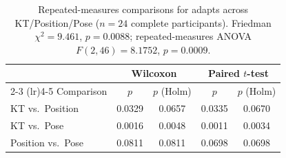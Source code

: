 \begin{table}[htbp]
\centering
\caption{Repeated-measures comparisons for adapts across KT/Position/Pose ($n = 24$ complete participants). Friedman $\chi^2 = 9.461$, $p = 0.0088$; repeated-measures ANOVA $F(2,46) = 8.1752$, $p = 0.0009$.}
\label{tab:comparisons-adapts}
\begin{tabular}{lcccc}
\toprule
& \multicolumn{2}{c}{Wilcoxon} & \multicolumn{2}{c}{Paired $t$-test} \\
\cmidrule(lr){2-3} \cmidrule(lr){4-5}
Comparison & $p$ & $p$ (Holm) & $p$ & $p$ (Holm) \\
\midrule
KT vs.\ Position   & 0.0329 & 0.0657 & 0.0335 & 0.0670 \\
KT vs.\ Pose       & 0.0016 & 0.0048 & 0.0011 & 0.0034 \\
Position vs.\ Pose & 0.0811 & 0.0811 & 0.0698 & 0.0698 \\
\bottomrule
\end{tabular}
\end{table}
